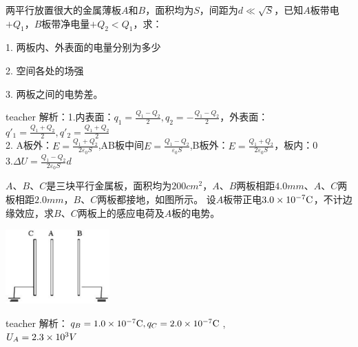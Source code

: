 \begin{example}
两平行放置很大的金属薄板$A$和$B$，面积均为$S$，间距为$d\ll\sqrt{S}$，已知$A$板带电$+Q_1$，$B$板带净电量$+Q_2<Q_1$，求：

1. 两板内、外表面的电量分别为多少

2. 空间各处的场强

3. 两板之间的电势差。
\begin{taggedblock}{teacher}
\newline
解析：1.内表面：$q_1=\frac{Q_1-Q_2}{2},q_2=-\frac{Q_1-Q_2}{2}$，外表面：$q'_1=\frac{Q_1+Q_2}{2},q'_2=\frac{Q_1+Q_2}{2}$
\\2. A板外：$E=\frac{Q_1+Q_2}{2\varepsilon_0S}$,AB板中间$E=\frac{Q_1-Q_2}{\varepsilon_0S}$,B板外：$E=\frac{Q_1+Q_2}{2\varepsilon_0S}$，板内：0
\\3.$\Delta U=\frac{Q_1-Q_2}{2\varepsilon_0S}d$
\end{taggedblock}
\end{example}

\begin{example}
$A、B、C$是三块平行金属板，面积均为$200\unit{cm^2}$，$A、B$两板相距$4.0\unit{mm}$、$A、C$两板相距$2.0\unit{mm}$，$B、C$两板都接地，如图所示。
设$A$板带正电$3.0\times 10^{-7}{\rm{C}}$，不计边缘效应，求$B$、$C$两板上的感应电荷及$A$板的电势。
\begin{flushright}
\includegraphics[width = 0.3\textwidth]{images/elec-problem-47.pdf} 
\end{flushright}
\begin{taggedblock}{teacher}
\noindent
解析：$q_B=1.0\times 10^{-7}{\rm{C}}, q_C=2.0\times 10^{-7}{\rm{C}}$,
\\$U_A=2.3\times 10^{3}V$
\end{taggedblock}
\end{example}

